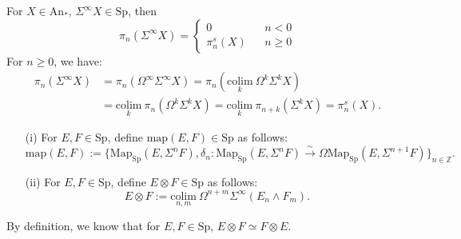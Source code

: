 \documentclass[UTF8,12,a4paper]{ctexart}
\theoremstyle{definition}
\newcommand{\An}{\text{An}}
\newcommand{\Sp}{\text{Sp}}
\begin{document}
\exm
For $X\in\An_*$, $\Sigma^\infty X\in \Sp$, then
\begin{equation*}
\pi_n(\Sigma^\infty X)=\left\{
\begin{aligned}
0 & &n<0\\
\pi_n^s(X)& &n\geq 0
\end{aligned}
\right.
\end{equation*}
\pf 
For $n\geq 0$, we have:
\begin{align*}
\pi_n(\Sigma^\infty X)
&=\pi_n(\Omega^\infty\Sigma^\infty X)
=\pi_n(\underset{k}{\text{colim}}\ \Omega^k\Sigma^k X)\\
&=\underset{k}{\text{colim}}\  \pi_n (\Omega^k\Sigma^k X)
=\underset{k}{\text{colim}}\  \pi_{n+k} (\Sigma^k X)
=\pi_n^s(X).
\end{align*}





\dfn 
\begin{itemize}
	\item [(i)]
	For $E, F\in\Sp$, define $\text{map}(E,F)\in \Sp$ as follows:
	$$
	\text{map}(E,F)
	:=\{\text{Map}_\Sp(E,\Sigma^n F), \delta_n:
	\text{Map}_\Sp(E,\Sigma^n F)\stackrel{\sim}{\rightarrow}
	\Omega \text{Map}_\Sp(E,\Sigma^{n+1} F)\}_{n\in\mathbb{Z}}.
	$$
	\item [(ii)] For $E, F\in\Sp$, define $E\otimes F\in \Sp$ as follows:
	$$
	E\otimes F:=\underset{n,m}{\text{colim}}\ \Omega^{n+m}\Sigma^\infty(E_n\wedge F_m).
	$$
\end{itemize}

\rem 
By definition, we know that for $E, F\in\Sp$, $E\otimes F\simeq F\otimes E$.
\end{document}
